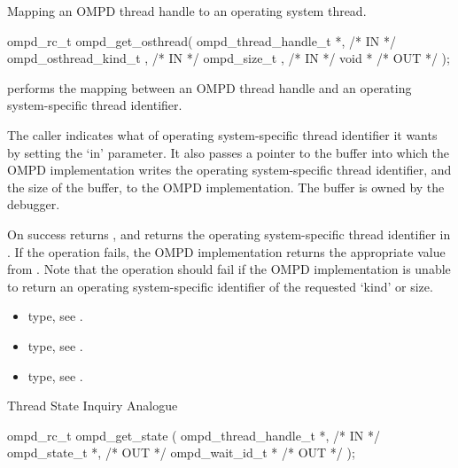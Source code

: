 \summary
Mapping an OMPD thread handle to an operating system thread.
\format
\cspecificstart
\begin{boxedcode}
ompd\_rc\_t ompd\_get\_osthread(
  ompd\_thread\_handle\_t *,                             /* IN */
  ompd\_osthread\_kind\_t ,                                      /* IN */
  ompd\_size\_t ,                           /* IN */
  void  *                                  /* OUT */
);
\end{boxedcode}
\cspecificend

\descr
{} performs the mapping between an OMPD
thread handle and an operating system-specific thread identifier.

\argdesc
The caller indicates what  of operating system-specific thread
identifier it wants by setting the 
`in' parameter.
It also passes a pointer to the buffer into which the OMPD
implementation writes the operating system-specific thread identifier,
and the size of the buffer, to the OMPD implementation.
The buffer is owned by the debugger.

On success  returns ,
and returns the operating system-specific thread identifier in
.
If the operation fails, the OMPD implementation returns
the appropriate value from .
Note that the operation should fail if the OMPD implementation is
unable to return an operating system-specific identifier of the
requested `kind' or size.

\crossreferences
\begin{itemize}
	\item {} type, see .
	\item {} type, see .
	\item {} type, see .
\end{itemize}


\summary
Thread State Inquiry Analogue
\format
\cspecificstart
\begin{boxedcode}
ompd\_rc\_t ompd\_get\_state (
  ompd\_thread\_handle\_t *,                             /* IN */
  ompd\_state\_t *,                                    /* OUT */
  ompd\_wait\_id\_t    *                                   /* OUT */
);
\end{boxedcode}
\cspecificend

